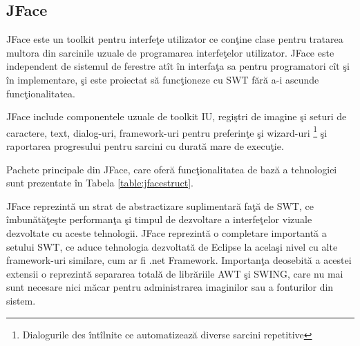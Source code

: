 \subsection{JFace}
JFace este un toolkit pentru interfeţe utilizator ce conţine clase pentru 
tratarea multora din sarcinile uzuale de programarea interfeţelor utilizator. 
JFace este independent de sistemul de ferestre atît în interfaţa sa pentru 
programatori cît şi în implementare, şi este proiectat să funcţioneze cu SWT 
fără a-i ascunde funcţionalitatea.

JFace include componentele uzuale de toolkit IU, regiştri de imagine şi seturi 
de caractere, text, dialog-uri, framework-uri pentru preferinţe şi wizard-uri
\footnote{Dialogurile des întîlnite ce automatizează diverse sarcini repetitive}
şi raportarea progresului pentru sarcini cu durată mare de execuţie.
\cite{jface}

Pachete principale din JFace, care oferă funcţionalitatea de bază a tehnologiei 
sunt prezentate în Tabela \ref{table:jfacestruct}.

JFace reprezintă un strat de abstractizare suplimentară faţă de SWT, ce
îmbunătăţeşte performanţa şi timpul de dezvoltare a interfeţelor vizuale
dezvoltate cu aceste tehnologii. JFace reprezintă o completare importantă a
setului SWT, ce aduce tehnologia dezvoltată de Eclipse la acelaşi nivel cu alte
framework-uri similare, cum ar fi .net Framework. Importanţa deosebită a acestei
extensii o reprezintă separarea totală de librăriile AWT şi SWING, care nu mai
sunt necesare nici măcar pentru administrarea imaginilor sau a fonturilor din
sistem.

